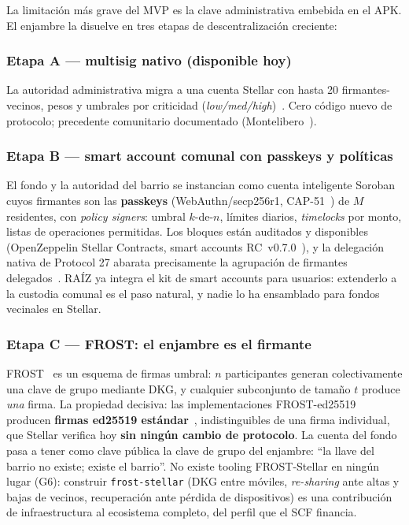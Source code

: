 \documentclass[twocolumn,10pt]{article}
\begin{document}
La limitaci\'on m\'as grave del MVP es la clave administrativa embebida en el APK. El enjambre la disuelve en tres etapas de descentralizaci\'on creciente:

\subsubsection{Etapa A --- multisig nativo (disponible hoy)}
La autoridad administrativa migra a una cuenta Stellar con hasta 20 firmantes-vecinos, pesos y umbrales por criticidad (\emph{low/med/high})~\cite{multisig}. Cero c\'odigo nuevo de protocolo; precedente comunitario documentado (Montelibero~\cite{montelibero}).

\subsubsection{Etapa B --- smart account comunal con passkeys y pol\'iticas}
El fondo y la autoridad del barrio se instancian como cuenta inteligente Soroban cuyos firmantes son las \textbf{passkeys} (WebAuthn/secp256r1, CAP-51~\cite{p21}) de $M$ residentes, con \emph{policy signers}: umbral $k$-de-$n$, l\'imites diarios, \emph{timelocks} por monto, listas de operaciones permitidas. Los bloques est\'an auditados y disponibles (OpenZeppelin Stellar Contracts, smart accounts RC~v0.7.0~\cite{ozsa}), y la delegaci\'on nativa de Protocol 27 abarata precisamente la agrupaci\'on de firmantes delegados~\cite{p27}. RA\'IZ ya integra el kit de smart accounts para usuarios: extenderlo a la custodia comunal es el paso natural, y nadie lo ha ensamblado para fondos vecinales en Stellar.

\subsubsection{Etapa C --- FROST: el enjambre es el firmante}
FROST~\cite{frost} es un esquema de firmas umbral: $n$ participantes generan colectivamente una clave de grupo mediante DKG, y cualquier subconjunto de tama\~no $t$ produce \emph{una} firma. La propiedad decisiva: las implementaciones FROST-ed25519 producen \textbf{firmas ed25519 est\'andar}~\cite{frosted}, indistinguibles de una firma individual, que Stellar verifica hoy \textbf{sin ning\'un cambio de protocolo}. La cuenta del fondo pasa a tener como clave p\'ublica la clave de grupo del enjambre: ``la llave del barrio no existe; existe el barrio''. No existe tooling FROST-Stellar en ning\'un lugar (G6): construir \texttt{frost-stellar} (DKG entre m\'oviles, \emph{re-sharing} ante altas y bajas de vecinos, recuperaci\'on ante p\'erdida de dispositivos) es una contribuci\'on de infraestructura al ecosistema completo, del perfil que el SCF financia.
\end{document}
